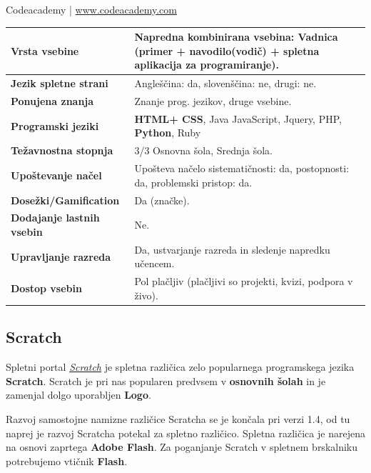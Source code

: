 \begin{osebnabox}[label={osebna:codeacademy}]{Codeacademy | \url{www.codeacademy.com}}
    \begin{tabular}{
  p{} |
  p{}  }
  \textbf{Vrsta vsebine} & Napredna kombinirana vsebina: Vadnica
                           (primer +  navodilo(vodič) + spletna
                           aplikacija za programiranje).  \\
      \hline
  \textbf{Jezik spletne strani} &  Angleščina: da, slovenščina: ne,
                                  drugi: ne. \\
      \hline
  \textbf{Ponujena znanja} & Znanje prog. jezikov, druge vsebine. \\
      \hline
 \textbf{Programski jeziki} & \textbf{HTML+ CSS}, Java JavaScript, Jquery, PHP,
                              \textbf{Python}, Ruby \\
      \hline
  \textbf{Težavnostna stopnja} & 3/3 Osnovna šola, Srednja šola. \\
      \hline
   \textbf{Upoštevanje načel} & Upošteva načelo sistematičnosti: da,
      postopnosti: da, problemski pristop: da. \\
      \hline
  \textbf{Dosežki/Gamification} & Da (značke). \\
      \hline
  \textbf{Dodajanje lastnih vsebin} & Ne. \\
      \hline
  \textbf{Upravljanje razreda} &Da, ustvarjanje razreda in sledenje
                                 napredku učencem. \\
      \hline
  \textbf{Dostop vsebin} & Pol plačljiv (plačljivi so projekti, kvizi,
                           podpora v živo). \\
\end{tabular}
\end{osebnabox}

\subsection{Scratch}
\label{sec:scratch}

Spletni portal \emph{\href{https://scratch.mit.edu/}{Scratch}}
\cite{web:scratch} je spletna različica zelo popularnega programskega
jezika \textbf{Scratch}. Scratch je pri nas popularen predvsem v
\textbf{osnovnih šolah} in je zamenjal dolgo uporabljen \textbf{Logo}.

Razvoj samostojne namizne različice Scratcha se je končala pri verzi
1.4, od tu naprej je razvoj Scratcha potekal za spletno
različico. Spletna različica je narejena na osnovi zaprtega
\textbf{Adobe Flash}. Za poganjanje Scratch v spletnem brskalniku
potrebujemo vtičnik \textbf{Flash}.


